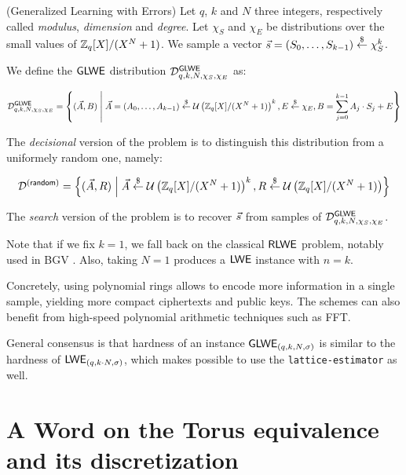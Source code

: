 \begin{definition}
	(Generalized Learning with Errors) Let $q$, $k$ and $N$ three integers, respectively called \textit{modulus}, \textit{dimension} and \textit{degree}. Let $\chi_S$ and $\chi_E$ be distributions over the small values of $\mathbb{Z}_q[X] / (X^N + 1)$. We sample a vector $\vec s = (S_0, \dots, S_{k-1}) \overset{\$}{\leftarrow} \chi_S^k$. 
	
	We define the $\textsf{GLWE}$ distribution $\mathcal{D}_{q, k, N, \chi_S, \chi_E}^{\textsf{GLWE}}$ as:
	
	\[
	\mathcal{D}_{q, k, N, \chi_S, \chi_E}^{\textsf{GLWE}} = \left \{ (\vec A, B) \;\middle|\; \vec A = (A_0, \dots, A_{k-1}) \overset{\$}{\leftarrow} \mathcal U \left ( \mathbb{Z}_q[X] / (X^N + 1) \right )^k, E \overset{\$}{\leftarrow} \chi_E, B = \sum_{j=0}^{k-1} A_j \cdot S_j + E \right \}
	\]
	
	The \textit{decisional} version of the problem is to distinguish this distribution from a uniformely random one, namely:
	
	\[
	\mathcal{D}^{(\textsf{random})} = \left \{(\vec A, R) \;\middle|\; \vec A \overset{\$}{\leftarrow} \mathcal U \left ( \mathbb{Z}_q[X] / (X^N + 1) \right )^k, R \overset{\$}{\leftarrow} \mathcal U \left ( \mathbb{Z}_q[X] / (X^N + 1) \right ) \right\}
	\]
	
	The \emph{search} version of the problem is to recover $\vec s$ from samples of $\mathcal{D}_{q, k , N, \chi_S, \chi_E}^{\textsf{GLWE}}$. 
	\label{def:GLWE}
	
\end{definition}

Note that if we fix $k = 1$, we fall back on the classical $\textsf{RLWE}$ problem, notably used in BGV \cite{bgv}. Also, taking $N=1$ produces a $\textsf{LWE}$ instance with $n = k$. 

Concretely, using polynomial rings allows to encode more information in a single sample, yielding more compact ciphertexts and public keys. The schemes can also benefit from high-speed polynomial arithmetic techniques such as FFT. 

General consensus is that hardness of an instance $\textsf{GLWE}_{(q, k, N, \sigma)}$ is similar to the hardness of $\textsf{LWE}_{(q, k \cdot N, \sigma)}$, which makes possible to use the \texttt{lattice-estimator} as well.








\section{A Word on the Torus equivalence and its discretization}
\label{sec:torus_equivalence}


